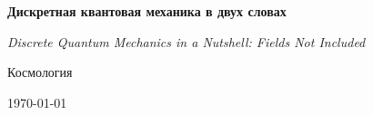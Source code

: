 \begin{titlepage}
  \centering
  \vspace*{2cm}
  {\LARGE\bfseries Дискретная квантовая механика в двух словах\par}
  \vspace{0.35cm}
  {\normalsize\itshape Discrete Quantum Mechanics in a Nutshell: Fields Not Included\par}
  \vspace{0.8cm}
  {\Large Космология\par}
  \vfill
  {\large \today\par}
\end{titlepage}
\clearpage

\clearpage
\tableofcontents
\clearpage
